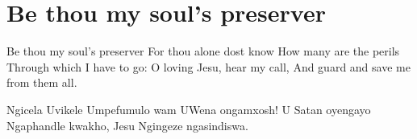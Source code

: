 \starttocol
\chapter{Be thou my soul's preserver}
\nexttocol
\hfill{\it }
\stoptocol
\starttocol
\startlines
{\sc Be} thou my soul's preserver
For thou alone dost know
How many are the perils
Through which I have to go:
O loving Jesu, hear my call,
And guard and save me from them all.

Ngicela Uvikele
Umpefumulo wam
UWena ongamxosh!
U Satan oyengayo
Ngaphandle kwakho, Jesu
Ngingeze ngasindiswa.
\stoplines
\nexttocol

\stoptocol
